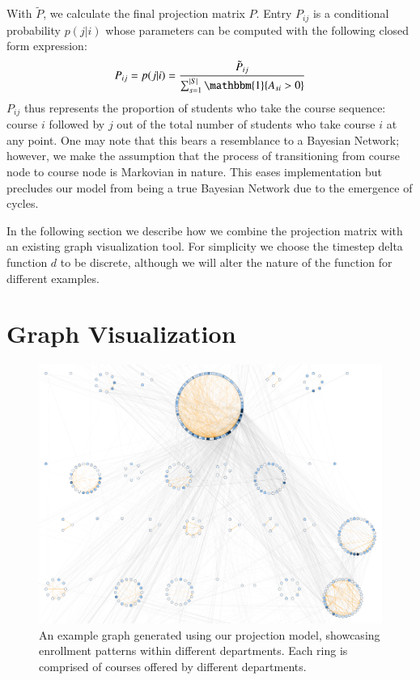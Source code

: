 \documentclass{sigchi}
\begin{document}
With $\tilde{P}$, we calculate the final projection matrix $P$. Entry $P_{ij}$ is a conditional probability $p(j|i)$ whose parameters can be computed with the following closed form expression:
\begin{equation}
    P_{ij} = p(j|i) = \frac{\tilde{P}_{ij}}{\sum_{s=1}^{|S|}\mathbbm{1}\{A_{si} > 0\}}
\end{equation}
$P_{ij}$ thus represents the proportion of students who take the
course sequence: course $i$ followed by $j$ out of the total number of
students who take course $i$ at any point. One may note that this
bears a resemblance to a Bayesian Network; however, we make the
assumption that the process of transitioning from course node to
course node is Markovian in nature. This eases implementation but
precludes our model from being a true Bayesian Network due to the
emergence of cycles.

In the following section we describe how we combine the projection
matrix with an existing graph visualization tool. For simplicity we
choose the timestep delta function $d$ to be discrete, although we
will alter the nature of the function for different examples.

\section{Graph Visualization}
\label{sec:visualization}

\begin{figure}
    \centering
    \includegraphics[width=\columnwidth]{final-overview.pdf}
    \caption{An example graph generated using our projection model,
      showcasing enrollment patterns within different departments. Each ring is comprised of courses offered by different departments.}
    \label{fig:overview}
\end{figure}
\end{document}

